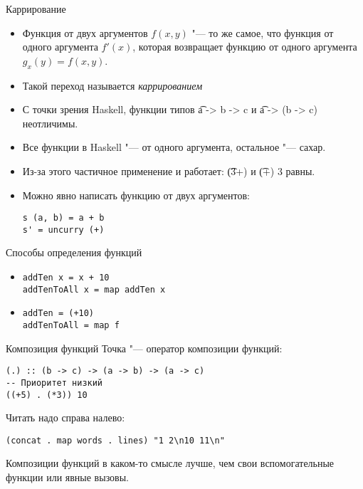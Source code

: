 \begin{frame}[fragile]{Каррирование}
	\begin{itemize}
		\item Функция от двух аргументов $f(x, y)$ "--- то же самое, что функция от одного аргумента $f'(x)$,
			которая возвращает функцию от одного аргумента $g_x(y)=f(x, y)$.
		\item Такой переход называется \textit{каррированием}
		\item С точки зрения Haskell, функции типов \t{a -> b -> c} и \t{a -> (b -> c)} неотличимы.
		\item Все функции в Haskell "--- от одного аргумента, остальное "--- сахар.
		\item Из-за этого частичное применение и работает: \t{(3+)} и \t{(+) 3} равны.
		\item Можно явно написать функцию от двух аргументов:
\begin{verbatim}
s (a, b) = a + b
s' = uncurry (+)
\end{verbatim}
	\end{itemize}
\end{frame}

\begin{frame}[fragile]{Способы определения функций}
	\begin{itemize}
		\item
\begin{verbatim}
addTen x = x + 10
addTenToAll x = map addTen x
\end{verbatim}
		\item
\begin{verbatim}
addTen = (+10)
addTenToAll = map f
\end{verbatim}
	\end{itemize}
\end{frame}

\begin{frame}[fragile]{Композиция функций}
	Точка "--- оператор композиции функций:
\begin{verbatim}
(.) :: (b -> c) -> (a -> b) -> (a -> c)
-- Приоритет низкий
((+5) . (*3)) 10
\end{verbatim}
	Читать надо справа налево:
\begin{verbatim}
(concat . map words . lines) "1 2\n10 11\n" 
\end{verbatim}
	Композиции функций в каком-то смысле лучше, чем свои вспомогательные функции или явные вызовы.
\end{frame}

